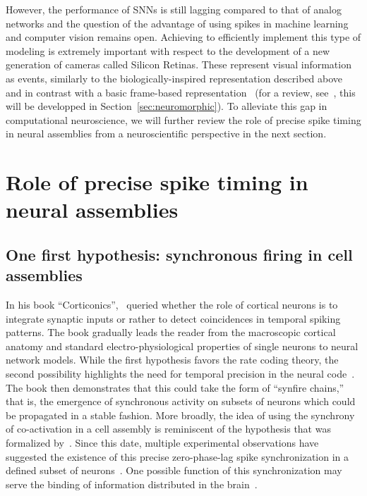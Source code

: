 \documentclass[brainsci, %
               review,submit,pdftex,moreauthors
               ]{Definitions/mdpi}
\begin{document}
However, the performance of SNNs is still lagging compared to that of analog networks and the question of the advantage of using spikes in machine learning and computer vision remains open. Achieving to efficiently implement this type of modeling is extremely important with respect to the development of a new generation of cameras called Silicon Retinas. These represent visual information as events, similarly to the biologically-inspired representation described above and in contrast with a basic frame-based representation~\citep{lichtsteiner_128x128_2008} (for a review, see~\citep{rasetto_challenges_2022}, this will be developped in Section~\ref{sec:neuromorphic}). %
To alleviate this gap in computational neuroscience, we will further review the role of  precise spike timing in neural assemblies from a neuroscientific perspective in the next section.
%
\section{Role of precise spike timing in neural assemblies}
\subsection{One first hypothesis: synchronous firing in cell assemblies}
%
In his book ``Corticonics'',~\citet{abeles_corticonics_1991} queried whether the role of cortical neurons is to integrate synaptic inputs or rather to detect coincidences in temporal spiking patterns. The book gradually leads the reader from the macroscopic cortical anatomy and standard electro-physiological properties of single neurons to neural network models. While the first hypothesis favors the rate coding theory, the second possibility highlights the need for temporal precision in the neural code~\citep{abeles_role_1982,paugam-moisy_computing_2012}. The book then demonstrates that this could take the form of ``synfire chains,'' that is, the emergence of synchronous activity on subsets of neurons which could be propagated in a stable fashion. More broadly, the idea of using the synchrony of co-activation in a cell assembly is reminiscent of the hypothesis that was formalized by~\citet{hebb_organization_1949}. Since this date, multiple experimental observations have suggested the existence of this precise zero-phase-lag spike synchronization in a defined subset of neurons~\citep{harris_organization_2003}. One possible function of this synchronization may serve the binding of information distributed in the brain~\citep{singer_visual_1995, roelfsema_visuomotor_1997}.
\end{document}
